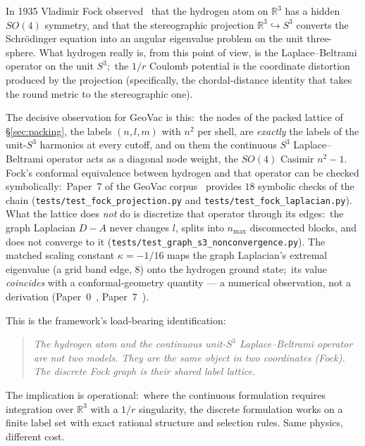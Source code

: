 \documentclass[11pt,a4paper]{article}
\newcommand{\sthree}{S^{3}}
\newcommand{\R}{\mathbb{R}}
\newcommand{\gvc}[2]{#2}
\begin{document}
In 1935 Vladimir Fock observed~\cite{fock1935} that the hydrogen atom
on $\R^3$ has a hidden $SO(4)$ symmetry, and that the stereographic
projection $\R^3 \hookrightarrow \sthree$ converts the Schr\"odinger
equation into an angular eigenvalue problem on the unit three-sphere.
What hydrogen really is, from this point of view, is the
Laplace--Beltrami operator on the unit $\sthree$;\ the $1/r$ Coulomb
potential is the coordinate distortion produced by the projection
(specifically, the chordal-distance identity that takes the round
metric to the stereographic one).

The decisive observation for GeoVac is this:\ the nodes of the packed
lattice of \S\ref{sec:packing}, the labels $(n, l, m)$ with $n^2$ per
shell, are \emph{exactly} the labels of the unit-$\sthree$ harmonics at
every cutoff, and on them the continuous $\sthree$ Laplace--Beltrami
operator acts as a diagonal node weight, the $SO(4)$ Casimir $n^2 - 1$.
Fock's conformal equivalence between hydrogen and that operator can be
checked symbolically:\ \gvc{paper7-symbolic-checks}{Paper~7 of the GeoVac
corpus~\cite{loutey_paper7} provides $18$ symbolic checks of the chain}
(\texttt{tests/test\_fock\_projection.py} and
\texttt{tests/test\_fock\_laplacian.py}).  \gvc{graph-s3-wall}{What the lattice does
\emph{not} do is discretize that operator through its edges:\ the graph
Laplacian $D - A$ never changes $l$, splits into $n_{\max}$ disconnected
blocks, and does not converge to it
(\texttt{tests/test\_graph\_s3\_nonconvergence.py})}.  The matched scaling
constant $\kappa = -1/16$ maps the graph Laplacian's extremal eigenvalue
(a grid band edge, $8$) onto the hydrogen ground state;\ its value
\emph{coincides} with a conformal-geometry quantity --- a numerical
observation, not a derivation
(Paper~0~\cite{loutey_paper0}, Paper~7~\cite{loutey_paper7}).

This is the framework's load-bearing identification:
\begin{quote}
\itshape
The hydrogen atom and the continuous unit-$\sthree$
Laplace--Beltrami operator are not two models.
They are the same object in two coordinates (Fock).  The discrete Fock
graph is their shared label lattice.
\end{quote}
The implication is operational:\ where the continuous formulation
requires integration over $\R^3$ with a $1/r$ singularity, the
discrete formulation works on a finite label set with exact
rational structure and selection rules.  Same physics, different cost.

\end{document}
